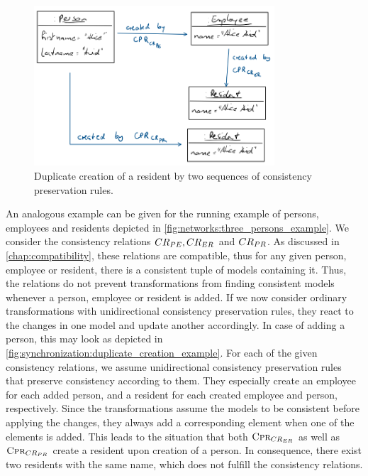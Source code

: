 \begin{figure}
    \centering
    \includegraphics[width=0.8\textwidth]{figures/correctness/synchronization/duplicate_creation_example.png}    
    \caption[Duplicate creation of an element]{Duplicate creation of a resident by two sequences of consistency preservation rules.}
    \label{fig:synchronization:duplicate_creation_example}
\end{figure}

An analogous example can be given for the running example of persons, employees and residents depicted in \autoref{fig:networks:three_persons_example}.
We consider the consistency relations $CR_{PE}, CR_{ER}$ and $CR_{PR}$.
As discussed in \autoref{chap:compatibility}, these relations are compatible, thus for any given person, employee or resident, there is a consistent tuple of models containing it.
Thus, the relations do not prevent transformations from finding consistent models whenever a person, employee or resident is added.
If we now consider ordinary transformations with unidirectional consistency preservation rules, they react to the changes in one model and update another accordingly.
In case of adding a person, this may look as depicted in \autoref{fig:synchronization:duplicate_creation_example}.
For each of the given consistency relations, we assume unidirectional consistency preservation rules that preserve consistency according to them.
They especially create an employee for each added person, and a resident for each created employee and person, respectively.
Since the transformations assume the models to be consistent before applying the changes, they always add a corresponding element when one of the elements is added.
This leads to the situation that both $\textsc{Cpr}_{CR_{ER}}$ as well as $\textsc{Cpr}_{CR_{PR}}$ create a resident upon creation of a person.
In consequence, there exist two residents with the same name, which does not fulfill the consistency relations.


